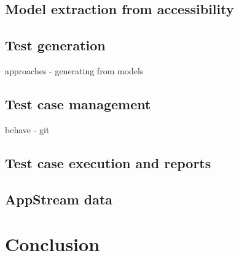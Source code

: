 \section{Model extraction from accessibility}
\section{Test generation}
approaches - generating from models 
\section{Test case management}
behave - git
\section{Test case execution and reports}
\section{AppStream data}

\chapter{Conclusion}